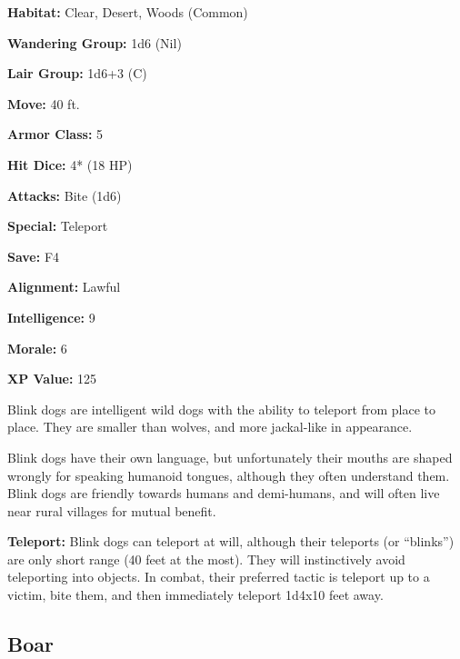 \begin{multicols*}{2}
{\textbf{Habitat:} Clear, Desert, Woods (Common)

\textbf{Wandering Group:} 1d6 (Nil)

\textbf{Lair Group:} 1d6+3 (C)

\textbf{Move:} 40 ft.

\textbf{Armor Class:} 5

\textbf{Hit Dice:} 4* (18 HP)

\textbf{Attacks:} Bite (1d6)

\textbf{Special:} Teleport

\textbf{Save:} F4

\textbf{Alignment:} Lawful

\textbf{Intelligence:} 9

\textbf{Morale:} 6

\textbf{XP Value:} 125}

Blink dogs are intelligent wild dogs with the ability to teleport from place to place. They are smaller than wolves, and more jackal-like in appearance.

Blink dogs have their own language, but unfortunately their mouths are shaped wrongly for speaking humanoid tongues, although they often understand them. Blink dogs are friendly towards humans and demi-humans, and will often live near rural villages for mutual benefit.

\textbf{Teleport:} Blink dogs can teleport at will, although their teleports (or “blinks”) are only short range (40 feet at the most). They will instinctively avoid teleporting into objects. In combat, their preferred tactic is teleport up to a victim, bite them, and then immediately teleport 1d4x10 feet away.

\subsection{Boar}
\end{multicols*}
